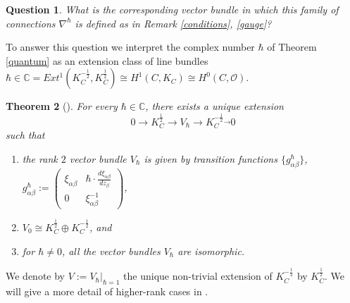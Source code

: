 \documentclass[oneside, 11pt]{amsart}
\newtheorem{thm}{Theorem}[section]
\newtheorem{quest}[thm]{Question}
\theoremstyle{definition}
\numberwithin{equation}{subsection}
\def\isom{\cong}
\def\a{\alpha}
\def\b{\beta}
\newcommand{\be}{\begin{equation}}
\newcommand{\ee}{\end{equation}}
\begin{document}
\begin{quest}
What is the corresponding vector bundle in which this family of connections $\nabla^{\hbar}$ is defined as in Remark \ref{conditions},  \eqref{gauge}?
\end{quest}




To answer this question we  interpret the complex number $\hbar$ of Theorem \ref{quantum} as an extension class of line bundles $\hbar\in \mathbb{C}=Ext^1(K_C^{-\frac{1}{2}}, K_C^{\frac{1}{2}})\isom H^1(C, K_C)\isom H^0(C, \mathcal{O}).$ 


\begin{thm}[\cite{Gun}]\label{gun1}
For every $\hbar\in \mathbb{C}$, there exists a unique 
extension 
\be \label{ses}
0\stackrel{}{\rightarrow}K_C^{\frac{1}{2}}\stackrel{}{\rightarrow}V_{\hbar}\stackrel{}{\rightarrow}K_C^{-\frac{1}{2}}\stackrel{\rightarrow}{}0
\ee
such that 
\begin{enumerate}
\item  the rank $2$
vector bundle $V_{\hbar}$ is given by transition functions $\{g_{\a\b}^{\hbar}\}$, $g_{\a\b}^{\hbar}:=\begin{pmatrix}
\xi_{\a\b}&\hbar\cdot\frac{d\xi_{\a\b}}{dz_{\b}}
\\ 0& \xi_{\a\b}^{-1}
\end{pmatrix}$,

\item $V_0\cong K_C^{\frac{1}{2}}\oplus K_C^{-\frac{1}{2}}$, and
\item for $\hbar\neq 0$, all the vector bundles $V_{\hbar}$  are isomorphic.

\end{enumerate}
\end{thm}

We denote by $V:=V_{\hbar}|_{\hbar=1}$ the unique non-trivial extension of $K_C^{-\frac{1}{2}}$
by $K_C^{\frac{1}{2}}$. We will give a more detail of higher-rank cases in \cite{OD21, OD22}.
\end{document}
